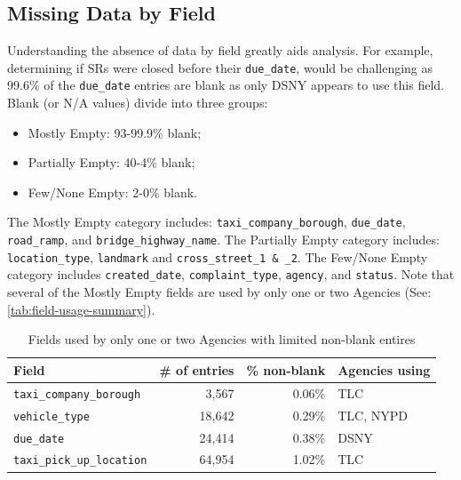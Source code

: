 \documentclass[linenumber]{jdsart}
\begin{document}
\subsection{Missing Data by Field}
\label{sec:blanks}
Understanding the absence of data by field greatly aids analysis. 
For example, determining if SRs were closed 
before their \texttt{due\_date}, would be challenging as 99.6\% of the
\texttt{due\_date} entries are blank as only DSNY appears to use this field.
Blank (or N/A values) divide into three groups:
\begin{itemize}[left=1.5em]
    \item Mostly Empty: 93-99.9\% blank;
    \item Partially Empty: 40-4\% blank;
    \item Few/None Empty: 2-0\% blank.
\end{itemize}

The Mostly Empty category includes:
\texttt{taxi\_company\_borough}, 
\texttt{due\_date}, 
\texttt{road\_ramp},
and \texttt{bridge\_highway\_name}. 
The Partially Empty category includes:
\texttt{location\_type}, 
\texttt{landmark} and \texttt{cross\_street\_1 \& \_2}.
The Few/None Empty category includes \texttt{created\_date}, 
\texttt{complaint\_type},
\texttt{agency}, 
and \texttt{status}. 
Note that several of the Mostly Empty fields are used by only one or 
two Agencies (See: \autoref{tab:field-usage-summary}).

\begin{table}[tbp]
    \centering
    \caption{Fields used by only one or two Agencies with limited non-blank entires}
    \label{tab:field-usage-summary}
    \small
    \begin{tabular}{l r r p{4cm}}
        \toprule
        \textbf{Field} & \textbf{\# of entries} & \textbf{\% non-blank} & \textbf{Agencies using} \\
        \midrule
        \texttt{taxi\_company\_borough} & 3,567  & 0.06\% & TLC \\
        \texttt{vehicle\_type}           & 18,642 & 0.29\% & TLC, NYPD \\
        \texttt{due\_date}               & 24,414 & 0.38\% & DSNY \\
        \texttt{taxi\_pick\_up\_location} & 64,954 & 1.02\% & TLC \\
        \bottomrule
    \end{tabular}
\end{table}
\end{document}
